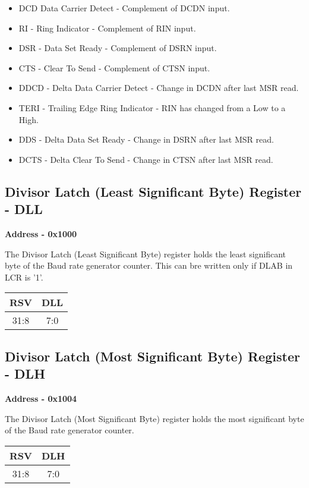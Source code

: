 \documentclass[12pt,a4paper]{report}
\begin{document}
\begin{itemize}
\item DCD Data Carrier Detect - Complement of DCDN input.
\item RI - Ring Indicator - Complement of RIN input.
\item DSR - Data Set Ready - Complement of DSRN input.
\item CTS - Clear To Send - Complement of CTSN input.
\item DDCD  - Delta Data Carrier Detect - Change in DCDN after last MSR read.
\item TERI - Trailing Edge Ring Indicator - RIN has changed from a Low to a High.
\item DDS -  Delta Data Set Ready - Change in DSRN after last MSR read.
\item DCTS - Delta Clear To Send - Change in CTSN after last MSR read.
\end{itemize}




\subsection{Divisor Latch (Least Significant Byte) Register - DLL }
\hspace{1.6cm}
\textbf{Address - 0x1000}


The Divisor Latch (Least Significant
Byte) register holds the least significant byte of the Baud rate generator counter. This can bre written only if DLAB in LCR is '1'.

\begin{center}
\begin{tabular}{|c|c| } 
 \hline
 RSV    & DLL \\ 
\hline
31:8 & 7:0\\
 \hline
\end{tabular}
\end{center}

\subsection{Divisor Latch (Most Significant Byte) Register - DLH }
\hspace{1.6cm}
\textbf{Address - 0x1004}


The Divisor Latch (Most Significant
Byte) register holds the most significant byte of the Baud rate generator counter. 

\begin{center}
\begin{tabular}{|c|c| } 
 \hline
 RSV    & DLH \\ 
\hline
31:8 & 7:0\\
 \hline
\end{tabular}
\end{center}
\end{document}
